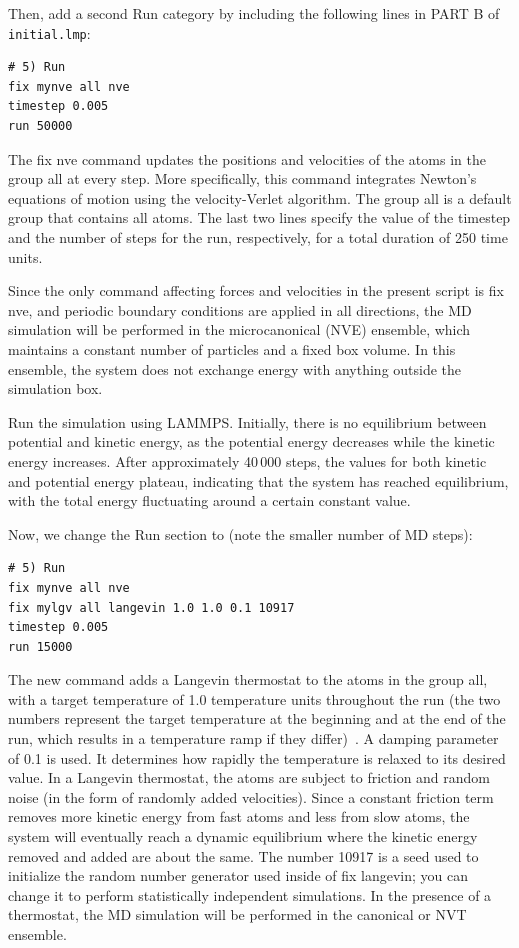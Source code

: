 \documentclass[9pt,tutorial]{livecoms}
\newcommand{\lmpcmd}[1]{\hspace{0pt}\colorbox{listing}{\textcolor{command}{\small{#1}}}\hspace{0pt}} %
\newcommand{\flecmd}[1]{\textcolor{command}{\texttt{#1}}} %
\begin{document}
Then, add a second \lmpcmd{Run} category by including the following
lines in \lmpcmd{PART B} of \flecmd{initial.lmp}:
\begin{lstlisting}
# 5) Run
fix mynve all nve
timestep 0.005
run 50000
\end{lstlisting}
The \lmpcmd{fix nve} command updates the positions and velocities of the
atoms in the group \lmpcmd{all} at every step.  {\color{blue}More specifically,
this command integrates Newton's equations of motion using the velocity-Verlet algorithm.} 
The group \lmpcmd{all} is a default group that contains all atoms.  The last two lines specify
the value of the \lmpcmd{timestep} and the number of steps for the
\lmpcmd{run}, respectively, for a total duration of 250 time units.

\begin{note}
  {\color{blue}Since the only command affecting forces and velocities in the
  present script is \lmpcmd{fix nve}, and periodic boundary conditions are applied
  in all directions,} the MD simulation will be performed in the microcanonical (NVE) ensemble, which
  maintains a constant number of particles and a fixed box volume. In
  this ensemble, the system does not exchange energy with anything
  outside the simulation box.
\end{note}

Run the simulation using LAMMPS.  Initially, there is no equilibrium
between potential and kinetic energy, as the potential energy
decreases while the kinetic energy increases.  After approximately
40\,000 steps, the values for both kinetic and potential energy
plateau, indicating that the system has reached equilibrium, with
the total energy fluctuating around a certain constant value.

Now, we change the \lmpcmd{Run} section to (note the smaller number of
MD steps):
\begin{lstlisting}
# 5) Run
fix mynve all nve
fix mylgv all langevin 1.0 1.0 0.1 10917
timestep 0.005
run 15000
\end{lstlisting}
The new command adds a Langevin thermostat to the atoms in the group
\lmpcmd{all}, with a target temperature of 1.0 temperature units
throughout the run (the two numbers represent the target temperature at
the beginning and at the end of the run, which results in a temperature
ramp if they differ)~\cite{schneider1978molecular}.  A \lmpcmd{damping}
parameter of 0.1 is used.  It determines how rapidly the temperature is
relaxed to its desired value.  In a Langevin thermostat, the atoms are
subject to friction and random noise (in the form of randomly added
velocities).  Since a constant friction term removes more kinetic energy
from fast atoms and less from slow atoms, the system will eventually
reach a dynamic equilibrium where the kinetic energy removed and added
are about the same.  The number 10917 is a seed used to initialize the
random number generator used inside of \lmpcmd{fix langevin}; you can
change it to perform statistically independent simulations.  In the
presence of a thermostat, the MD simulation will be performed in the
canonical or NVT ensemble.
\end{document}
